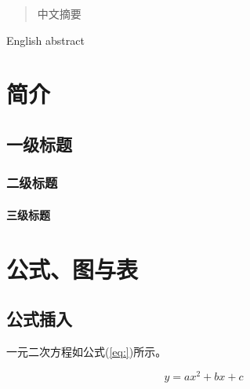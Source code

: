 \documentclass[
    Print       = false,
    Title       = 中国海洋大学硕博学位论文LaTeX模板,
    Author      = 作者,
    Advisor     = 指导教师,
    Thesis      = 全日制专业学位,
    Major       = 专业名称,
    Topic       = 研究方向,
    Year        = 2021,
    Month       = 4,
    Day         = 28,
    TitleEng    = {{LaTeX template for master's and doctoral dissertations of Ocean University of China}}
]{oucthesis}
\begin{document}
    \makefrontcover
    
    
    \makesign
    
    \makecopyright

    \begin{abstract}
        中文摘要

    \end{abstract}

    \begin{enabstract}
        English abstract
    \end{enabstract}
    
    \tableofcontents
    
    \mainmatter

    \chapter{简介}

    \section{一级标题}

    \subsection{二级标题}

    \subsubsection{三级标题}

    \chapter{公式、图与表}

    \section{公式插入}

    一元二次方程如公式(\ref{eq:})所示。

    \begin{equation}
        y=ax^2+bx+c
        \label{eq:}
    \end{equation}
\end{document}
